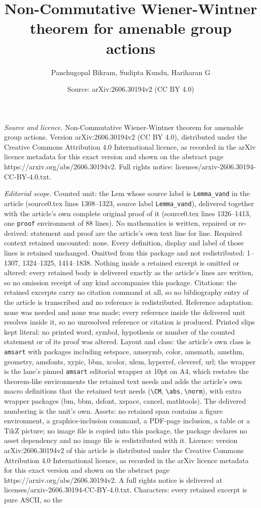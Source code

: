 \documentclass[10pt,a4paper]{amsart}
\title[Non-Commutative Wiener-Wintner theorem for amenable group ac]{Non-Commutative Wiener-Wintner theorem for amenable group actions}
\author{Panchugopal Bikram, Sudipta Kundu, Hariharan G}
\date{Source: arXiv:2606.30194v2 (CC BY 4.0)}
\begin{document}
\maketitle

\noindent\emph{Source and licence.} Non-Commutative Wiener-Wintner theorem for amenable group actions. Version arXiv:2606.30194v2 (CC BY 4.0), distributed under the Creative Commons Attribution 4.0 International licence, as recorded in the arXiv licence metadata for this exact version and shown on the abstract page https://arxiv.org/abs/2606.30194v2. Full rights notice: licenses/arxiv-2606.30194-CC-BY-4.0.txt.\par\smallskip

\noindent\textit{Editorial scope.} Counted unit: the Lem whose source label is \texttt{Lemma\_vand} in the article (source0.tex lines 1308--1323, source label \texttt{Lemma\_vand}), delivered together with the article's own complete original proof of it (source0.tex lines 1326--1413, one \texttt{proof} environment of 88 lines). No mathematics is written, repaired or re-derived: statement and proof are the article's own text line for line. Required context retained uncounted: none. Every definition, display and label of those lines is retained unchanged. Omitted from this package and not redistributed: 1--1307, 1324--1325, 1414--1838. Nothing inside a retained excerpt is omitted or altered: every retained body is delivered exactly as the article's lines are written, so no omission receipt of any kind accompanies this package. Citations: the retained excerpts carry no citation command at all, so no bibliography entry of the article is transcribed and no reference is redistributed. Reference adaptation: none was needed and none was made; every reference inside the delivered unit resolves inside it, so no unresolved reference or citation is produced. Printed slips kept literal: no printed word, symbol, hypothesis or number of the counted statement or of its proof was altered. Layout and class: the article's own class is \texttt{amsart} with packages including setspace, amssymb, color, amsmath, amsthm, geometry, amsfonts, xypic, bbm, xcolor, ulem, hyperref, cleveref, url; the wrapper is the lane's pinned \texttt{amsart} editorial wrapper at 10pt on A4, which restates the theorem-like environments the retained text needs and adds the article's own macro definitions that the retained text needs (\texttt{\textbackslash CM}, \texttt{\textbackslash abs}, \texttt{\textbackslash norm}), with extra wrapper packages (bm, bbm, dsfont, xspace, cancel, mathtools). The delivered numbering is the unit's own. Assets: no retained span contains a figure environment, a graphics-inclusion command, a PDF-page inclusion, a table or a TikZ picture; no image file is copied into this package, the package declares no asset dependency and no image file is redistributed with it. Licence: version arXiv:2606.30194v2 of this article is distributed under the Creative Commons Attribution 4.0 International licence, as recorded in the arXiv licence metadata for this exact version and shown on the abstract page https://arxiv.org/abs/2606.30194v2. A full rights notice is delivered at licenses/arxiv-2606.30194-CC-BY-4.0.txt. Characters: every retained excerpt is pure ASCII, so the 
\end{document}
